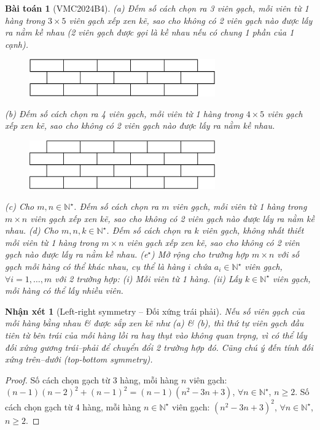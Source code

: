 \documentclass{article}
\newtheorem{baitoan}{Bài toán}
\newtheorem{nhanxet}{Nhận xét}
\begin{document}
\begin{baitoan}[VMC2024B4]
	(a) Đếm số cách chọn ra 3 viên gạch, mỗi viên từ 1 hàng trong $3\times5$ viên gạch xếp xen kẽ, sao cho không có 2 viên gạch nào được lấy ra nằm kề nhau (2 viên gạch được gọi là kề nhau nếu có chung 1 phần của 1 cạnh).
	\begin{figure}[H]
		\centering
		\includegraphics[width=8cm]{brick3x5}
	\end{figure}
	(b) Đếm số cách chọn ra 4 viên gạch, mỗi viên từ 1 hàng trong $4\times5$ viên gạch xếp xen kẽ, sao cho không có 2 viên gạch nào được lấy ra nằm kề nhau.
	\begin{figure}[H]
		\centering
		\includegraphics[width=8cm]{brick4x5}
	\end{figure}
	(c) Cho $m,n\in\mathbb{N}^\star$. Đếm số cách chọn ra $m$ viên gạch, mỗi viên từ 1 hàng trong $m\times n$ viên gạch xếp xen kẽ, sao cho không có 2 viên gạch nào được lấy ra nằm kề nhau. (d) Cho $m,n,k\in\mathbb{N}^\star$. Đếm số cách chọn ra $k$ viên gạch, không nhất thiết mỗi viên từ 1 hàng trong $m\times n$ viên gạch xếp xen kẽ, sao cho không có 2 viên gạch nào được lấy ra nằm kề nhau. (e${}^\star$) Mở rộng cho trường hợp $m\times n$ với số gạch mỗi hàng có thể khác nhau, cụ thể là hàng $i$ chứa $a_i\in\mathbb{N}^\star$ viên gạch, $\forall i = 1,\ldots,m$ với 2 trường hợp: (i) Mỗi viên từ 1 hàng. (ii) Lấy $k\in\mathbb{N}^\star$ viên gạch, mỗi hàng có thể lấy nhiều viên.
\end{baitoan}

\begin{nhanxet}[Left-right symmetry -- Đối xứng trái phải]
	Nếu số viên gạch của mỗi hàng bằng nhau \& được sắp xen kẽ như (a) \& (b), thì thứ tự viên gạch đầu tiên từ bên trái của mỗi hàng lồi ra hay thụt vào không quan trọng, vì có thể lấy đối xứng gương trái--phải để chuyển đổi 2 trường hợp đó. Cũng chú ý đến tính đối xứng trên--dưới (top-bottom symmetry).
\end{nhanxet}

\begin{proof}
	Số cách chọn gạch từ 3 hàng, mỗi hàng $n$ viên gạch: $(n - 1)(n - 2)^2 + (n - 1)^2 = (n - 1)(n^2 - 3n + 3)$, $\forall n\in\mathbb{N}^\star$, $n\ge2$. Số cách chọn gạch từ 4 hàng, mỗi hàng $n\in\mathbb{N}^\star$ viên gạch: $(n^2 - 3n + 3)^2$, $\forall n\in\mathbb{N}^\star$, $n\ge2$.
\end{proof}
\end{document}
